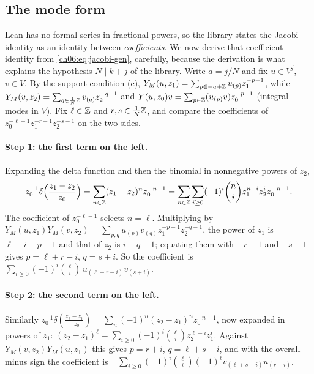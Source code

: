 \subsection{The mode form}

Lean has no formal series in fractional powers, so the library states the Jacobi identity as an
identity between \emph{coefficients}.  We now derive that coefficient identity from
\eqref{ch06:eq:jacobi-gen}, carefully, because the derivation is what explains the hypothesis
$N\mid k+j$ of the library.  Write $a=j/N$ and fix $u\in V^j$, $v\in V$.  By the support condition
(c), $Y_M(u,z_1)=\sum_{p\in-a+{\mathbb{Z}}}u_{(p)}z_1^{-p-1}$, while $Y_M(v,z_2)=\sum_{q\in\frac1N{\mathbb{Z}}}
v_{(q)}z_2^{-q-1}$ and $Y(u,z_0)v=\sum_{p\in{\mathbb{Z}}}(u_{(p)}v)z_0^{-p-1}$ (integral modes in $V$).
Fix $\ell\in{\mathbb{Z}}$ and $r,s\in\frac1N{\mathbb{Z}}$, and compare the coefficients of
$z_0^{-\ell-1}z_1^{-r-1}z_2^{-s-1}$ on the two sides.

\paragraph{Step 1: the first term on the left.}  Expanding the delta function and then the binomial
in nonnegative powers of $z_2$,
\begin{equation*}
  z_0^{-1}\delta\Bigl(\frac{z_1-z_2}{z_0}\Bigr)=\sum_{n\in{\mathbb{Z}}}(z_1-z_2)^nz_0^{-n-1}
  =\sum_{n\in{\mathbb{Z}}}\sum_{i\ge0}(-1)^i\binom ni z_1^{n-i}z_2^{i}z_0^{-n-1}.
\end{equation*}
The coefficient of $z_0^{-\ell-1}$ selects $n=\ell$.  Multiplying by
$Y_M(u,z_1)Y_M(v,z_2)=\sum_{p,q}u_{(p)}v_{(q)}z_1^{-p-1}z_2^{-q-1}$, the power of $z_1$ is
$\ell-i-p-1$ and that of $z_2$ is $i-q-1$; equating them with $-r-1$ and $-s-1$ gives $p=\ell+r-i$,
$q=s+i$.  So the coefficient is $\sum_{i\ge0}(-1)^i\binom\ell i\,u_{(\ell+r-i)}v_{(s+i)}$.

\paragraph{Step 2: the second term on the left.}  Similarly
$z_0^{-1}\delta(\frac{z_2-z_1}{-z_0})=\sum_n(-1)^n(z_2-z_1)^nz_0^{-n-1}$, now expanded in powers of
$z_1$: $(z_2-z_1)^\ell=\sum_{i\ge0}(-1)^i\binom\ell i z_2^{\ell-i}z_1^{i}$.  Against
$Y_M(v,z_2)Y_M(u,z_1)$ this gives $p=r+i$, $q=\ell+s-i$, and with the overall minus sign the
coefficient is $-\sum_{i\ge0}(-1)^i\binom\ell i(-1)^\ell v_{(\ell+s-i)}u_{(r+i)}$.

